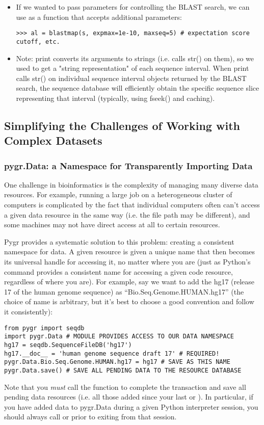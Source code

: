 \documentclass{howto}
\begin{document}
\begin{itemize}
\item
If we wanted to pass parameters for controlling the BLAST search, we
can use  as a function that accepts additional parameters:
\begin{verbatim}
>>> al = blastmap(s, expmax=1e-10, maxseq=5) # expectation score cutoff, etc.
\end{verbatim}

\item
Note: print converts its arguments to strings (i.e. calls str() on them), so we used  to get a "string representation" of each sequence interval.  When print calls str() on individual sequence interval objects returned by the BLAST search, the sequence database will efficiently obtain the specific sequence slice representing that interval (typically, using fseek() and caching).
\end{itemize}

\subsection{Simplifying the Challenges of Working with Complex Datasets}
\subsubsection{pygr.Data: a Namespace for Transparently Importing Data}
One challenge in bioinformatics is the complexity of managing many diverse
data resources.  For example, running a large job on a heterogeneous cluster
of computers is complicated by the fact that individual computers often can't
access a given data resource in the same way (i.e. the file path may be different),
and some machines may not have direct access at all to certain resources.

Pygr provides a systematic solution to this problem: creating a consistent
namespace for data.  A given resource is given a unique name that then becomes
its universal handle for accessing it, no matter where you are (just as Python's
 command provides a consistent name for accessing a given code
resource, regardless of where you are).  For example, say we want to add the
hg17 (release 17 of the human genome sequence) as ``Bio.Seq.Genome.HUMAN.hg17''
(the choice of name is arbitrary, but it's best to choose a good convention and follow
it consistently):

\begin{verbatim}
from pygr import seqdb
import pygr.Data # MODULE PROVIDES ACCESS TO OUR DATA NAMESPACE
hg17 = seqdb.SequenceFileDB('hg17')
hg17.__doc__ = 'human genome sequence draft 17' # REQUIRED!
pygr.Data.Bio.Seq.Genome.HUMAN.hg17 = hg17 # SAVE AS THIS NAME
pygr.Data.save() # SAVE ALL PENDING DATA TO THE RESOURCE DATABASE
\end{verbatim}
Note that you {\em must} call the function  to 
complete the transaction and save all pending data resources
(i.e. all those added since your last  or
).  In particular, if you have added
data to pygr.Data during a given Python interpreter session, you
should always call  or
 prior to exiting from that session.
\end{document}
